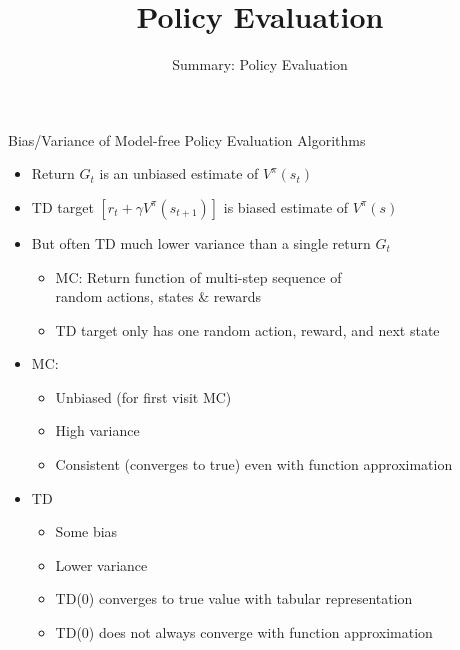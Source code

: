 \documentclass[aspectratio=169]{../latex_main/tntbeamer}  %
\title[Reinforcement Learning: Policy Evaluation]{Policy Evaluation}
\subtitle{Summary: Policy Evaluation}
\begin{document}
	
	\maketitle

\begin{frame}[c]{Bias/Variance of Model-free Policy Evaluation Algorithms}

\begin{itemize}
	\item Return $G_t$ is an unbiased estimate of $V^\pi(s_t)$
	\item TD target $[r_t + \gamma V^\pi(s_{t+1})]$ is biased estimate of $V^\pi(s)$ 
	\item But often TD much lower variance than a single return $G_t$
	\begin{itemize}
		\item MC: Return function of multi-step sequence of \\ random actions, states \& rewards
		\item TD target only has one random action, reward, and next state
	\end{itemize}
	\pause
	\item MC:
	\begin{itemize}
		\item Unbiased (for first visit MC)
		\item High variance
		\item Consistent (converges to true) even with function approximation
	\end{itemize}
	\pause
	\item TD
	\begin{itemize}
		\item Some bias
		\item Lower variance
		\item TD(0) converges to true value with tabular representation
		\item TD(0) does not always converge with function approximation
	\end{itemize}
\end{itemize}
	
\end{frame}
\end{document}
